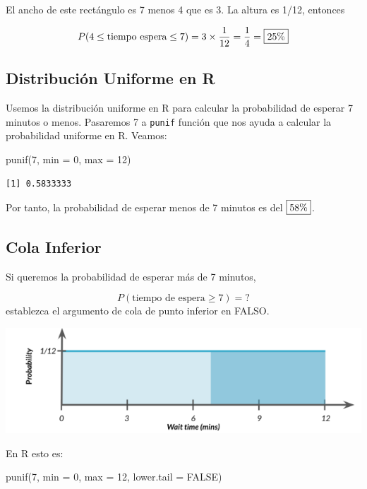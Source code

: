 \documentclass[
  letterpaper,
  DIV=11,
  numbers=noendperiod]{scrreprt}
\newenvironment{Shaded}{\begin{snugshade}}{\end{snugshade}}
\newcommand{\AttributeTok}[1]{\textcolor[rgb]{0.40,0.45,0.13}{#1}}
\newcommand{\ConstantTok}[1]{\textcolor[rgb]{0.56,0.35,0.01}{#1}}
\newcommand{\DecValTok}[1]{\textcolor[rgb]{0.68,0.00,0.00}{#1}}
\newcommand{\FunctionTok}[1]{\textcolor[rgb]{0.28,0.35,0.67}{#1}}
\newcommand{\NormalTok}[1]{\textcolor[rgb]{0.00,0.23,0.31}{#1}}
\begin{document}
El ancho de este rectángulo es 7 menos 4 que es 3. La altura es 1/12,
entonces

\[
P(4\leq \mbox{tiempo espera}\leq 7) = 3\times \frac{1}{12} = \frac{1}{4} = \fbox{25\%}
\]

\hypertarget{distribuciuxf3n-uniforme-en-r}{%
\subsection{Distribución Uniforme en
R}\label{distribuciuxf3n-uniforme-en-r}}

Usemos la distribución uniforme en R para calcular la probabilidad de
esperar 7 minutos o menos. Pasaremos 7 a \texttt{punif} función que nos
ayuda a calcular la probabilidad uniforme en R. Veamos:

\begin{Shaded}
\begin{Highlighting}[]
\FunctionTok{punif}\NormalTok{(}\DecValTok{7}\NormalTok{, }\AttributeTok{min =} \DecValTok{0}\NormalTok{, }\AttributeTok{max =} \DecValTok{12}\NormalTok{)}
\end{Highlighting}
\end{Shaded}

\begin{verbatim}
[1] 0.5833333
\end{verbatim}

Por tanto, la probabilidad de esperar menos de 7 minutos es del
\(\fbox{58\%}\).

\hypertarget{cola-inferior}{%
\subsection{Cola Inferior}\label{cola-inferior}}

Si queremos la probabilidad de esperar más de 7 minutos,

\[P(\mbox{tiempo de espera} \geq 7) = ?\]establezca el argumento de cola
de punto inferior en FALSO.

\includegraphics{fig33.png}

En R esto es:

\begin{Shaded}
\begin{Highlighting}[]
\FunctionTok{punif}\NormalTok{(}\DecValTok{7}\NormalTok{, }\AttributeTok{min =} \DecValTok{0}\NormalTok{, }\AttributeTok{max =} \DecValTok{12}\NormalTok{, }\AttributeTok{lower.tail =} \ConstantTok{FALSE}\NormalTok{)}
\end{Highlighting}
\end{Shaded}
\end{document}
